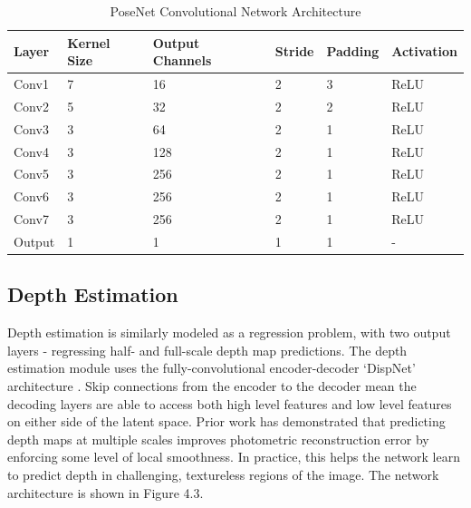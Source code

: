 \begin{table}[h]

    \caption{PoseNet Convolutional Network Architecture}
    \centering
    \begin{tabular}{@{}llllll@{}}
        \toprule
        Layer               & Kernel Size   & Output Channels   & Stride    & Padding   & Activation\\ 
        \midrule
        Conv1               & 7             & 16                & 2         & 3         & ReLU      \\ 
        Conv2               & 5             & 32                & 2         & 2         & ReLU      \\ 
        Conv3               & 3             & 64                & 2         & 1         & ReLU      \\ 
        Conv4               & 3             & 128               & 2         & 1         & ReLU      \\
        Conv5               & 3             & 256               & 2         & 1         & ReLU      \\
        Conv6               & 3             & 256               & 2         & 1         & ReLU      \\
        Conv7               & 3             & 256               & 2         & 1         & ReLU      \\
        Output              & 1             & 1                 & 1         & 1         & -         \\ 
        \bottomrule
    \end{tabular}
    \label{posenet-layers}
\end{table}


\subsection{Depth Estimation}

Depth estimation is similarly modeled as a regression problem, with two output layers - regressing half- and full-scale depth map predictions. The depth estimation module uses the fully-convolutional encoder-decoder `DispNet' architecture \cite{mayer2015dispnet}. Skip connections from the encoder to the decoder mean the decoding layers are able to access both high level features and low level features on either side of the latent space. Prior work \cite{zhou2017unsupervised} has demonstrated that predicting depth maps at multiple scales improves photometric reconstruction error by enforcing some level of local smoothness. In practice, this helps the network learn to predict depth in challenging, textureless regions of the image. The network architecture is shown in Figure 4.3.

